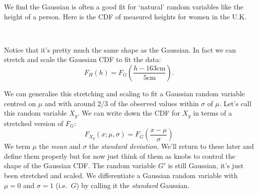 \documentclass[a4paper]{article}
\begin{document}
We find the Gaussian is often a good fit for `natural' random variables like
the height of a person. Here is the CDF of measured heights for women in the
U.K.

{\center
{} \\ \null
}

Notice that it's pretty much the same shape as the Gaussian. In fact we can
stretch and scale the Gaussian CDF to fit the data:
\[
F_H(h) = F_G\left( \frac{h - 163\mbox{cm}}{5\mbox{cm}} \right).
\]

We can generalise this stretching and scaling to fit a Gaussian random variable
centred on $\mu$ and with around 2/3 of the observed values within $\sigma$ of
$\mu$. Let's call this random variable $X_g$. We can write down the CDF for
$X_g$ in terms of a stretched version of $F_G$:
\[
\boxed{ F_{X_g}(x;\mu,\sigma) = F_G\left( \frac{x - \mu}{\sigma} \right) }
\]
We term $\mu$ the \emph{mean} and $\sigma$ the \emph{standard deviation}. We'll
return to these later and define them properly but for now just think of them
as knobs to control the shape of the Gaussian CDF. The random variable $G'$ is
still Gaussian, it's just been stretched and scaled. We differentiate a
Gaussian random variable with $\mu = 0$ and $\sigma = 1$ (i.e.\ $G$) by calling
it the \emph{standard} Gaussian.
\end{document}

